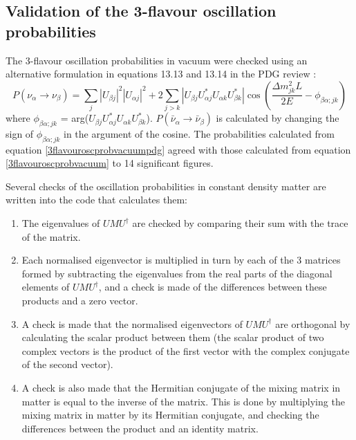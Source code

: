 \clearpage

\subsection{Validation of the 3-flavour oscillation probabilities}
\label{3flavourvalidation}

The 3-flavour oscillation probabilities in vacuum were checked using an alternative formulation in equations 13.13 and 13.14 
in the PDG review \cite{pdgreview}:
\begin{equation}
P(\nu_{\alpha} \rightarrow \nu_{\beta}) = \sum_{j} |U_{\beta j}|^{2} |U_{\alpha j}|^{2} + 2 \sum_{j>k} |U_{\beta j} U_{\alpha j}^{*} U_{\alpha k} U_{\beta k}^{*}| 
\cos \left(\frac{\Delta m_{jk}^{2} L}{2E}  - \phi_{\beta \alpha;jk}  \right)
\label{3flavouroscprobvacuumpdg}
\end{equation}
where $\phi_{\beta \alpha;jk}$ = arg($U_{\beta j} U_{\alpha j}^{*} U_{\alpha k} U_{\beta k}^{*}$). $P(\bar{\nu}_{\alpha} \rightarrow \bar{\nu}_{\beta})$ 
is calculated by changing the sign of $\phi_{\beta \alpha;jk}$ in the argument of the cosine. The probabilities calculated from equation \ref{3flavouroscprobvacuumpdg} 
agreed with those calculated from equation \ref{3flavouroscprobvacuum} to 14 significant figures.

Several checks of the oscillation probabilities in constant density matter are written into the code that calculates them: 
\begin{enumerate}
\item The eigenvalues of $U M U^{\dagger}$ are checked by comparing their sum with the trace of the matrix. 
\item Each normalised eigenvector is multiplied in turn by each of the 3 matrices formed by subtracting the eigenvalues from the real parts of the 
diagonal elements of $U M U^{\dagger}$, and a check is made of the differences between these products and a zero vector. 
\item A check is made that the normalised eigenvectors of $U M U^{\dagger}$ are orthogonal by calculating the scalar product between them (the scalar product of two 
complex vectors is the product of the first vector with the complex conjugate of the second vector). 
\item A check is also made that the Hermitian conjugate of the mixing matrix in matter is equal to the inverse of the matrix. This is done by multiplying the 
mixing matrix in matter by its Hermitian conjugate, and checking the differences between the product and an identity matrix.
\end{enumerate}


